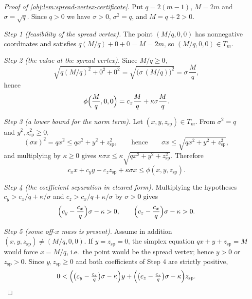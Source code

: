 \documentclass[11pt]{article}
\begin{document}
\begin{proof}[Proof of \cref{obj:lem:spread-vertex-certificate}]
Put \(q=2(m-1)\), \(M=2m\) and \(\sigma=\sqrt q\).  Since \(q>0\) we have \(\sigma>0\), \(\sigma^2=q\), and \(M=q+2>0\).

\emph{Step 1 (feasibility of the spread vertex).}  The point \((M/q,0,0)\) has nonnegative coordinates and satisfies \(q(M/q)+0+0=M=2m\), so \((M/q,0,0)\in T_m\). %

\emph{Step 2 (the value at the spread vertex).}  Since \(M/q\ge0\),
\[
\sqrt{q(M/q)^2+0^2+0^2}=\sqrt{\bigl(\sigma\,(M/q)\bigr)^2}=\sigma\,\frac{M}{q},
\]
hence
\[
\phi\Bigl(\frac Mq,0,0\Bigr)=c_x\frac Mq+\kappa\sigma\frac Mq .
\]

\emph{Step 3 (a lower bound for the norm term).}  Let \((x,y,z_{\mathrm{sp}})\in T_m\).  From \(\sigma^2=q\) and \(y^2,z_{\mathrm{sp}}^2\ge0\),
\[
(\sigma x)^2=qx^2\le qx^2+y^2+z_{\mathrm{sp}}^2,
\qquad\text{hence}\qquad
\sigma x\le\sqrt{qx^2+y^2+z_{\mathrm{sp}}^2},
\]
and multiplying by \(\kappa\ge0\) gives \(\kappa\sigma x\le\kappa\sqrt{qx^2+y^2+z_{\mathrm{sp}}^2}\).  Therefore
\[
c_xx+c_yy+c_zz_{\mathrm{sp}}+\kappa\sigma x\le\phi(x,y,z_{\mathrm{sp}}).
\]

\emph{Step 4 (the coefficient separation in cleared form).}  Multiplying the hypotheses \(c_y>c_x/q+\kappa/\sigma\) and \(c_z>c_x/q+\kappa/\sigma\) by \(\sigma>0\) gives
\[
\Bigl(c_y-\frac{c_x}{q}\Bigr)\sigma-\kappa>0,
\qquad
\Bigl(c_z-\frac{c_x}{q}\Bigr)\sigma-\kappa>0 .
\]

\emph{Step 5 (some off-\(x\) mass is present).}  Assume in addition \((x,y,z_{\mathrm{sp}})\ne(M/q,0,0)\).  If \(y=z_{\mathrm{sp}}=0\), the simplex equation \(qx+y+z_{\mathrm{sp}}=M\) would force \(x=M/q\), i.e.\ the point would be the spread vertex; hence \(y>0\) or \(z_{\mathrm{sp}}>0\).  Since \(y,z_{\mathrm{sp}}\ge0\) and both coefficients of Step 4 are strictly positive,
\[
0<\Bigl(\bigl(c_y-\tfrac{c_x}{q}\bigr)\sigma-\kappa\Bigr)y
+\Bigl(\bigl(c_z-\tfrac{c_x}{q}\bigr)\sigma-\kappa\Bigr)z_{\mathrm{sp}} .
\]


\end{proof}
\end{document}
